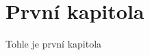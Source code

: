 \hypertarget{prvnuxed-kapitola}{%
\chapter{První kapitola}\label{prvnuxed-kapitola}}

Tohle je první kapitola~\parencite{nespor05}
